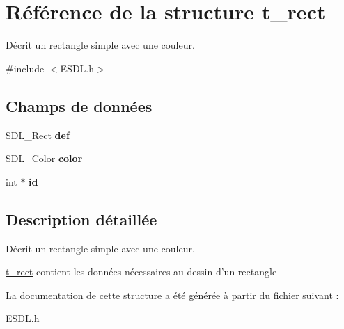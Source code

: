 \hypertarget{structt__rect}{\section{Référence de la structure t\+\_\+rect}
\label{structt__rect}
}


Décrit un rectangle simple avec une couleur.  




{\ttfamily \#include $<$E\+S\+D\+L.\+h$>$}

\subsection*{Champs de données}
\begin{DoxyCompactItemize}
\item 
\hypertarget{structt__rect_a6dba9e0fcedd8ff346f9d8a95b16ae82}{S\+D\+L\+\_\+\+Rect {\bfseries def}}\label{structt__rect_a6dba9e0fcedd8ff346f9d8a95b16ae82}

\item 
\hypertarget{structt__rect_a231190c738b6dd929f41db76b95d369f}{S\+D\+L\+\_\+\+Color {\bfseries color}}\label{structt__rect_a231190c738b6dd929f41db76b95d369f}

\item 
\hypertarget{structt__rect_a7cfb3bcb65e72ed4a05356433e7d3998}{int $\ast$ {\bfseries id}}\label{structt__rect_a7cfb3bcb65e72ed4a05356433e7d3998}

\end{DoxyCompactItemize}


\subsection{Description détaillée}
Décrit un rectangle simple avec une couleur. 

\hyperlink{structt__rect}{t\+\_\+rect} contient les données nécessaires au dessin d'un rectangle 

La documentation de cette structure a été générée à partir du fichier suivant \+:\begin{DoxyCompactItemize}
\item 
\hyperlink{_e_s_d_l_8h}{E\+S\+D\+L.\+h}\end{DoxyCompactItemize}
